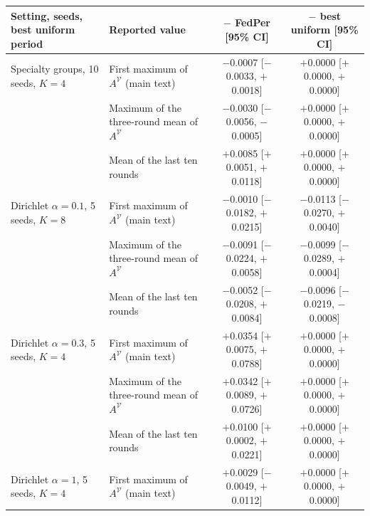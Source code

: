 \begin{tabular}{@{}llcc@{}}
\toprule
Setting, seeds, best uniform period & Reported value & \tierfed{} $-$ FedPer [95\% CI] & \tierfed{} $-$ best uniform [95\% CI]\\
\midrule
Specialty groups, 10 seeds, $K=4$ & First maximum of $A^{\mathcal V}$ (main text) & \ensuremath{-}0.0007 [\ensuremath{-}0.0033, \ensuremath{+}0.0018] & \ensuremath{+}0.0000 [\ensuremath{+}0.0000, \ensuremath{+}0.0000]\\
 & Maximum of the three-round mean of $A^{\mathcal V}$ & \ensuremath{-}0.0030 [\ensuremath{-}0.0056, \ensuremath{-}0.0005] & \ensuremath{+}0.0000 [\ensuremath{+}0.0000, \ensuremath{+}0.0000]\\
 & Mean of the last ten rounds & \ensuremath{+}0.0085 [\ensuremath{+}0.0051, \ensuremath{+}0.0118] & \ensuremath{+}0.0000 [\ensuremath{+}0.0000, \ensuremath{+}0.0000]\\
\midrule
Dirichlet $\alpha=0.1$, 5 seeds, $K=8$ & First maximum of $A^{\mathcal V}$ (main text) & \ensuremath{-}0.0010 [\ensuremath{-}0.0182, \ensuremath{+}0.0215] & \ensuremath{-}0.0113 [\ensuremath{-}0.0270, \ensuremath{+}0.0040]\\
 & Maximum of the three-round mean of $A^{\mathcal V}$ & \ensuremath{-}0.0091 [\ensuremath{-}0.0224, \ensuremath{+}0.0058] & \ensuremath{-}0.0099 [\ensuremath{-}0.0289, \ensuremath{+}0.0004]\\
 & Mean of the last ten rounds & \ensuremath{-}0.0052 [\ensuremath{-}0.0208, \ensuremath{+}0.0084] & \ensuremath{-}0.0096 [\ensuremath{-}0.0219, \ensuremath{-}0.0008]\\
\midrule
Dirichlet $\alpha=0.3$, 5 seeds, $K=4$ & First maximum of $A^{\mathcal V}$ (main text) & \ensuremath{+}0.0354 [\ensuremath{+}0.0075, \ensuremath{+}0.0788] & \ensuremath{+}0.0000 [\ensuremath{+}0.0000, \ensuremath{+}0.0000]\\
 & Maximum of the three-round mean of $A^{\mathcal V}$ & \ensuremath{+}0.0342 [\ensuremath{+}0.0089, \ensuremath{+}0.0726] & \ensuremath{+}0.0000 [\ensuremath{+}0.0000, \ensuremath{+}0.0000]\\
 & Mean of the last ten rounds & \ensuremath{+}0.0100 [\ensuremath{+}0.0002, \ensuremath{+}0.0221] & \ensuremath{+}0.0000 [\ensuremath{+}0.0000, \ensuremath{+}0.0000]\\
\midrule
Dirichlet $\alpha=1$, 5 seeds, $K=4$ & First maximum of $A^{\mathcal V}$ (main text) & \ensuremath{+}0.0029 [\ensuremath{-}0.0049, \ensuremath{+}0.0112] & \ensuremath{+}0.0000 [\ensuremath{+}0.0000, \ensuremath{+}0.0000]\\

\end{tabular}
